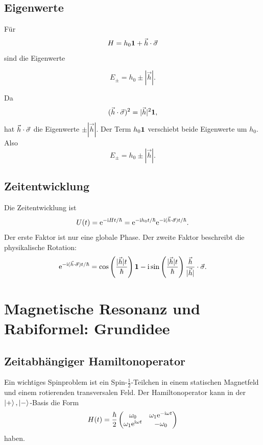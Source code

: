 \subsection{Eigenwerte}

Für
\[
    H=h_0\mathbf{1}+\vec h\cdot\vec\sigma
\]
sind die Eigenwerte
\begin{formulabox}
\[
    E_\pm=h_0\pm|\vec h|.
\]
\end{formulabox}

\begin{derivationbox}
Da
\[
    (\vec h\cdot\vec\sigma)^2=|\vec h|^2\mathbf{1},
\]
hat \(\vec h\cdot\vec\sigma\) die Eigenwerte \(\pm|\vec h|\). Der Term \(h_0\mathbf{1}\) verschiebt beide Eigenwerte um \(h_0\). Also
\[
    E_\pm=h_0\pm|\vec h|.
\]
\end{derivationbox}

\subsection{Zeitentwicklung}

Die Zeitentwicklung ist
\[
    U(t)=\mathrm{e}^{-\mathrm{i} Ht/\hbar}
    =\mathrm{e}^{-\mathrm{i} h_0t/\hbar}
    \mathrm{e}^{-\mathrm{i} (\vec h\cdot\vec\sigma)t/\hbar}.
\]
Der erste Faktor ist nur eine globale Phase. Der zweite Faktor beschreibt die physikalische Rotation:
\[
    \mathrm{e}^{-\mathrm{i} (\vec h\cdot\vec\sigma)t/\hbar}
    =\cos\left(\frac{|\vec h|t}{\hbar}\right)\mathbf{1}
    -\mathrm{i}\sin\left(\frac{|\vec h|t}{\hbar}\right)\frac{\vec h}{|\vec h|}\cdot\vec\sigma.
\]

\section{Magnetische Resonanz und Rabiformel: Grundidee}

\subsection{Zeitabhängiger Hamiltonoperator}

Ein wichtiges Spinproblem ist ein Spin-\(\frac12\)-Teilchen in einem statischen Magnetfeld und einem rotierenden transversalen Feld. Der Hamiltonoperator kann in der \(\left|+\right\rangle,\left|-\right\rangle\)-Basis die Form
\[
    H(t)=\frac{\hbar}{2}
    \begin{pmatrix}
        \omega_0&\omega_1\mathrm{e}^{-\mathrm{i}\omega t}\\
        \omega_1\mathrm{e}^{\mathrm{i}\omega t}&-\omega_0
    \end{pmatrix}
\]
haben.

